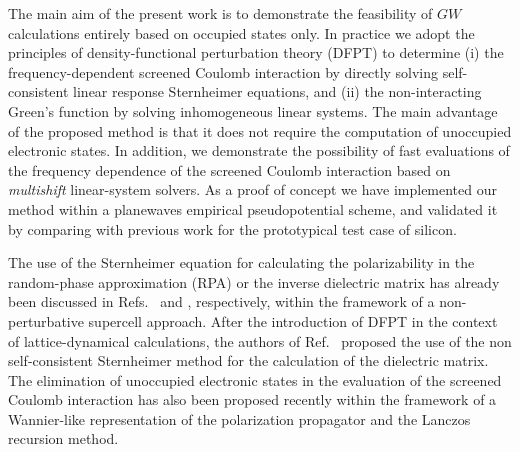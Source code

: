 \documentclass[twocolumn,prb,showpacs,superscriptaddress]{revtex4}
\begin{document}
The main aim of the present work is to demonstrate the feasibility of $GW$ calculations
entirely based on occupied states only.\cite{baroni.rmp}
In practice we adopt the principles of density-functional perturbation theory (DFPT) 
to determine (i) the frequency-dependent screened Coulomb interaction
by directly solving self-consistent linear response Sternheimer equations,
and (ii) the non-interacting Green's function by solving
inhomogeneous linear systems. The main advantage of the proposed method 
is that it does not require the computation of unoccupied electronic states.
In addition, we demonstrate the possibility of fast evaluations of 
the frequency dependence of the screened Coulomb interaction
based on {\it multishift} linear-system solvers.\cite{frommer}
%
As a proof of concept we have implemented our method within
a planewaves empirical pseudopotential scheme,\cite{cohen_berg} 
and validated it by comparing with previous work for the prototypical test case of silicon.

The use of the Sternheimer equation for calculating the polarizability
in the random-phase approximation (RPA) or the inverse dielectric matrix 
has already been discussed in Refs.\  and ,
respectively, 
within the framework of a non-perturbative supercell approach. After the introduction 
of DFPT in the context of lattice-dynamical calculations,\cite{giannozzi} 
the authors of Ref.\  proposed the
use of the non self-consistent Sternheimer method for the calculation
of the dielectric matrix. The elimination of unoccupied electronic states
in the evaluation of the screened Coulomb interaction has also been 
proposed recently within the framework of a Wannier-like representation
of the polarization propagator and the Lanczos recursion method.\cite{umari1,umari2}
\end{document}
